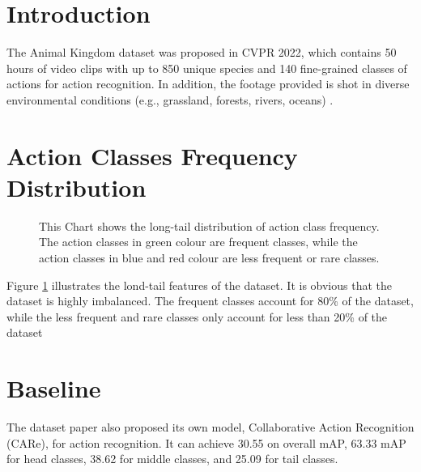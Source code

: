 \section{Introduction}
The Animal Kingdom dataset was proposed in CVPR 2022, which contains 50 hours of video clips with up to 850 unique species and 140 fine-grained classes of actions for action recognition. In addition, the footage provided is shot in diverse environmental conditions (e.g., grassland, forests, rivers, oceans) \parencite{ng2022animal}.

\section{Action Classes Frequency Distribution}

\begin{figure}[ht]
    \centering
    \resizebox{1.0\textwidth}{!}{}
    \caption[Action Classes Frequency Distribution]{This Chart shows the long-tail distribution of action class frequency. The action classes in green colour are frequent classes, while the action classes in blue and red colour are less frequent or rare classes.}
    \label{fig:classfreqdist}
\end{figure}

Figure \ref{fig:classfreqdist} illustrates the lond-tail features of the dataset. It is obvious that the dataset is highly imbalanced. The frequent classes account for 80\% of the dataset, while the less frequent and rare classes only account for less than 20\% of the dataset

\section{Baseline}
The dataset paper also proposed its own model, Collaborative Action Recognition (CARe), for action recognition. It can achieve 30.55 on overall mAP, 63.33 mAP for head classes, 38.62 for middle classes, and 25.09 for tail classes.
   